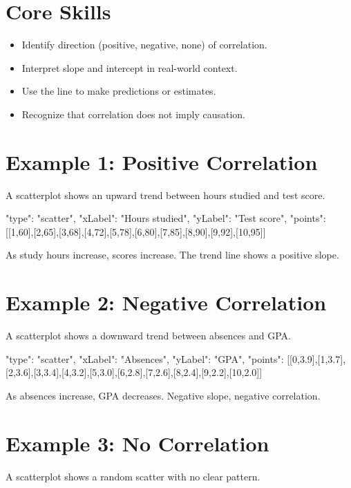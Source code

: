 \documentclass[14pt]{extarticle}
\begin{document}
\section*{Core Skills}
\begin{itemize}
  \item Identify direction (positive, negative, none) of correlation.
  \item Interpret slope and intercept in real-world context.
  \item Use the line to make predictions or estimates.
  \item Recognize that correlation does not imply causation.
\end{itemize}

\section*{Example 1: Positive Correlation}

A scatterplot shows an upward trend between hours studied and test score.

\begin{diagramdata}
{
  "type": "scatter",
  "xLabel": "Hours studied",
  "yLabel": "Test score",
  "points": [[1,60],[2,65],[3,68],[4,72],[5,78],[6,80],[7,85],[8,90],[9,92],[10,95]]
}
\end{diagramdata}

As study hours increase, scores increase.
The trend line shows a positive slope.

\section*{Example 2: Negative Correlation}

A scatterplot shows a downward trend between absences and GPA.

\begin{diagramdata}
{
  "type": "scatter",
  "xLabel": "Absences",
  "yLabel": "GPA",
  "points": [[0,3.9],[1,3.7],[2,3.6],[3,3.4],[4,3.2],[5,3.0],[6,2.8],[7,2.6],[8,2.4],[9,2.2],[10,2.0]]
}
\end{diagramdata}

As absences increase, GPA decreases.
Negative slope, negative correlation.

\section*{Example 3: No Correlation}

A scatterplot shows a random scatter with no clear pattern.
\end{document}
